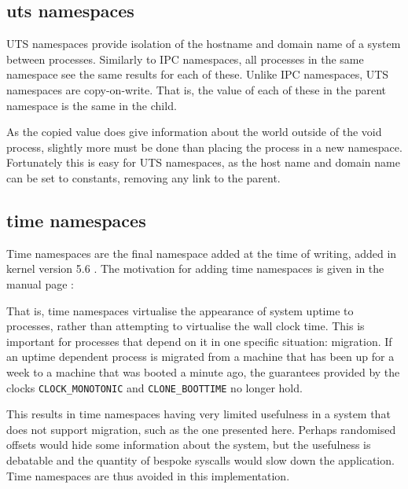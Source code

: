\documentclass[sigplan]{acmart}
\begin{document}
\subsection{uts namespaces}

UTS namespaces provide isolation of the hostname and domain name of a system between processes. Similarly to IPC namespaces, all processes in the same namespace see the same results for each of these. Unlike IPC namespaces, UTS namespaces are copy-on-write. That is, the value of each of these in the parent namespace is the same in the child.

As the copied value does give information about the world outside of the void process, slightly more must be done than placing the process in a new namespace. Fortunately this is easy for UTS namespaces, as the host name and domain name can be set to constants, removing any link to the parent.

\subsection{time namespaces}


\label{sec:time-namespaces}

Time namespaces are the final namespace added at the time of writing, added in kernel version 5.6 \citep{noauthor_linux_2020}. The motivation for adding time namespaces is given in the manual page \citep{free_software_foundation_time_namespaces7_2021}:


That is, time namespaces virtualise the appearance of system uptime to processes, rather than attempting to virtualise the wall clock time. This is important for processes that depend on it in one specific situation: migration. If an uptime dependent process is migrated from a machine that has been up for a week to a machine that was booted a minute ago, the guarantees provided by the clocks \texttt{CLOCK\_MONOTONIC} and \texttt{CLONE\_BOOTTIME} no longer hold.

This results in time namespaces having very limited usefulness in a system that does not support migration, such as the one presented here. Perhaps randomised offsets would hide some information about the system, but the usefulness is debatable and the quantity of bespoke syscalls would slow down the application. Time namespaces are thus avoided in this implementation.
\end{document}
